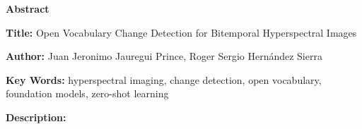 \clearpage
\begin{center}\textbf{Abstract}\end{center}

\noindent\textbf{Title:} Open Vocabulary Change Detection for Bitemporal Hyperspectral Images

\noindent\textbf{Author:} Juan Jeronimo Jauregui Prince, Roger Sergio Hernández Sierra

\noindent\textbf{Key Words:} hyperspectral imaging, change detection, open vocabulary, foundation models, zero-shot learning

\noindent\textbf{Description:} 
